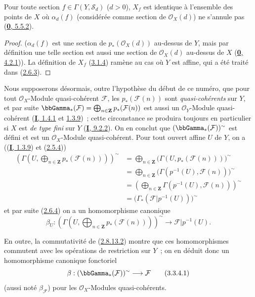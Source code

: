 \begin{proposition}[3.3.3]
\label{II.3.3.3-fr}
Pour toute section $f\in\Gamma(Y,\mathcal{S}_d)$ ($d>0$), $X_f$ est identique
à l'ensemble des points de $X$ où $\alpha_d(f)$ (considérée comme section de
$\mathcal{O}_X(d)$) ne s'annule pas
\textup{(\hyperref[0.5.5.2-fr]{\textbf{0}, 5.5.2})}.
\end{proposition}

\begin{proof}
($\alpha_d(f)$ est une section de $p_*(\mathcal{O}_X(d))$ au-dessus de $Y$,
mais par définition une telle section est aussi une section de
$\mathcal{O}_X(d)$ au-dessus de $X$
(\hyperref[0.4.2.1-fr]{\textbf{0}, 4.2.1})). La définition de $X_f$
(\hyperref[II.3.1.4-fr]{3.1.4}) ramène au cas où $Y$ est affine, qui a été
traité dans (\hyperref[II.2.6.3-fr]{2.6.3}).
\end{proof}

\begin{env}[3.3.4]
\label{II.3.3.4-fr}
Nous supposerons désormais, outre l'hypothèse du début de ce numéro, que pour
tout $\mathcal{O}_X$-Module quasi-cohérent $\mathcal{F}$, les
$p_*(\mathcal{F}(n))$ sont \emph{quasi-cohérents} sur $Y$, et par suite
$\bbGamma_*(\mathcal{F})=\bigoplus_{n\in\mathbf{Z}}p_*(\mathcal{F}(n))$ est
aussi un $\mathcal{O}_Y$-Module quasi-cohérent
(\hyperref[I.1.4.1-fr]{\textbf{I}, 1.4.1} et
\hyperref[I.1.3.9-fr]{1.3.9})~; cette circonstance se produira toujours en
particulier si $X$ est \emph{de type fini} sur $Y$
(\hyperref[I.9.2.2-fr]{\textbf{I}, 9.2.2}). On en conclut que
$(\bbGamma_*(\mathcal{F}))^{\sim}$ est défini et est un
$\mathcal{O}_X$-Module quasi-cohérent. Pour tout ouvert affine $U$ de $Y$, on
a ((\hyperref[I.1.3.9-fr]{\textbf{I}, 1.3.9}) et
(\hyperref[II.2.5.4-fr]{2.5.4}))
\begin{align*}
  \left(\Gamma\left(U,\bigoplus_{n\in\mathbf{Z}}
  p_*(\mathcal{F}(n))\right)\right)^{\sim}
  &=\bigoplus_{n\in\mathbf{Z}}
  \bigl(\Gamma(U,p_*(\mathcal{F}(n)))\bigr)^{\sim}\\
  &=\bigoplus_{n\in\mathbf{Z}}
  \bigl(\Gamma(p^{-1}(U),\mathcal{F}(n))\bigr)^{\sim}\\
  &=\left(\bigoplus_{n\in\mathbf{Z}}
  \Gamma(p^{-1}(U),\mathcal{F}(n))\right)^{\sim}\\
  &=\bigl(\Gamma_*(\mathcal{F}|p^{-1}(U))\bigr)^{\sim}
\end{align*}
et par suite (\hyperref[II.2.6.4-fr]{2.6.4}) on a un homomorphisme canonique
\[
  \beta_U:\left(\Gamma\left(U,\bigoplus_{n\in\mathbf{Z}}
  p_*(\mathcal{F}(n))\right)\right)^{\sim}
  \longrightarrow\mathcal{F}|p^{-1}(U).
\]

En outre, la commutativité de
(\hyperref[II.2.8.13.2-fr]{2.8.13.2}) montre que ces homomorphismes commutent
avec les opérations de restriction sur $Y$~; on en déduit donc un
homomorphisme canonique fonctoriel
\[
\label{II.3.3.4.1-fr}
  \beta:(\bbGamma_*(\mathcal{F}))^{\sim}\longrightarrow\mathcal{F}
\tag{3.3.4.1}
\]
(aussi noté $\beta_{\mathcal{F}}$) pour les $\mathcal{O}_X$-Modules
quasi-cohérents.
\end{env}

